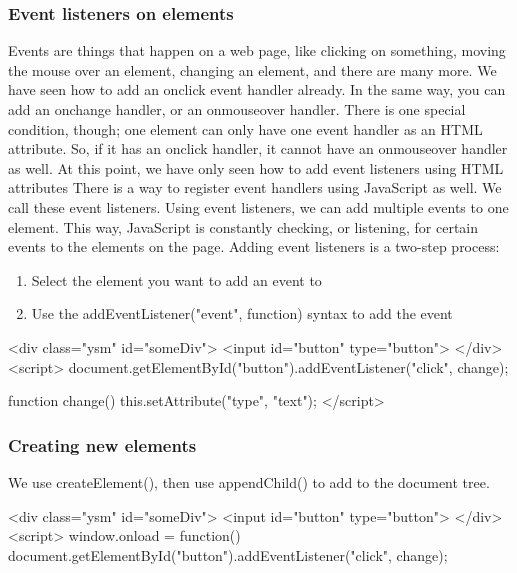\documentclass{report}
\begin{document}
\begin{jscode}
\bigbreak \noindent 
\subsubsection{Event listeners on elements}
\bigbreak \noindent 
Events are things that happen on a web page, like clicking on something, moving the
mouse over an element, changing an element, and there are many more. We have
seen how to add an onclick event handler already. In the same way, you can add an
onchange handler, or an onmouseover handler. There is one special condition, though;
one element can only have one event handler as an HTML attribute. So, if it has an
onclick handler, it cannot have an onmouseover handler as well. At this point, we
have only seen how to add event listeners using HTML attributes
\bigbreak \noindent 
There is a way to register event handlers using JavaScript as well. We call these event
listeners. Using event listeners, we can add multiple events to one element. This way,
JavaScript is constantly checking, or listening, for certain events to the elements on
the page. Adding event listeners is a two-step process:
\begin{enumerate}
    \item Select the element you want to add an event to
    \item Use the addEventListener("event", function) syntax to add the event
\end{enumerate}
\bigbreak \noindent 
\begin{jscode}
    <div class="ysm" id="someDiv">  
        <input id="button" type="button">
    </div>
    <script> 
        document.getElementById("button").addEventListener("click", change);

        function change() {
            this.setAttribute("type", "text");
        }
    </script>
\end{jscode}

\bigbreak \noindent 
\subsubsection{Creating new elements}
\bigbreak \noindent 
We use createElement(), then use appendChild() to add to the document tree.
\bigbreak \noindent 
\begin{jscode}
    <div class="ysm" id="someDiv">  
        <input id="button" type="button">
    </div>
    <script> 
        window.onload = function() {
            document.getElementById("button").addEventListener("click", change);
        }


\end{jscode}
\end{jscode}
\end{document}
